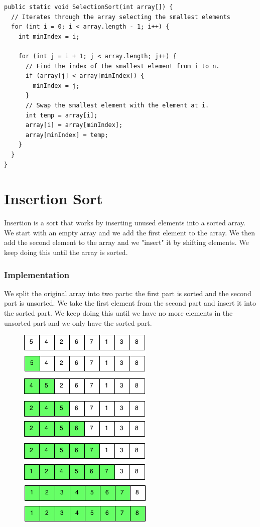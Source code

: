 \documentclass[11pt,oneside]{book}
\makeatletter
\def\maxwidth#1{\ifdim\Gin@nat@width>#1 #1\else\Gin@nat@width\fi}
\makeatother
\begin{document}
\begin{lstlisting}
public static void SelectionSort(int array[]) {
  // Iterates through the array selecting the smallest elements
  for (int i = 0; i < array.length - 1; i++) {
    int minIndex = i;

    for (int j = i + 1; j < array.length; j++) {
      // Find the index of the smallest element from i to n.
      if (array[j] < array[minIndex]) {
        minIndex = j;
      }
      // Swap the smallest element with the element at i.
      int temp = array[i];
      array[i] = array[minIndex];
      array[minIndex] = temp;
    }
  }
}

\end{lstlisting}

        \section{ Insertion Sort }
        

Insertion is a sort that works by inserting unused elements into a sorted array. We start with an empty array and we add the first element to the array. We then add the second element to the array and we "insert" it by shifting elements. We keep doing this until the array is sorted.

\subsubsection{Implementation}

We split the original array into two parts: the first part is sorted and the second part is unsorted. We take the first element from the second part and insert it into the sorted part. We keep doing this until we have no more elements in the unsorted part and we only have the sorted part.

\vspace{5px}\begin{figure}[H]\centering
        \includegraphics[width=0.66\maxwidth{\textwidth}]{insertion_sort.png}
        \end{figure}
\end{document}
